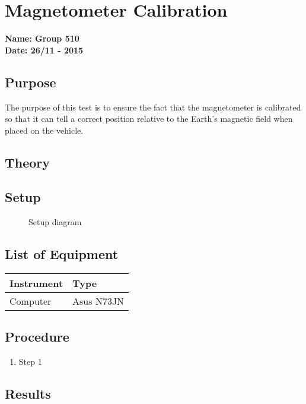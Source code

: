 \pagebreak
\section{Magnetometer Calibration} \label{app:magnetoCalibration}
\textbf{Name: Group 510}\\
\textbf{Date: 26/11 - 2015}

\subsection{Purpose}
The purpose of this test is to ensure the fact that the magnetometer is calibrated so that it can tell a correct position relative to the Earth's magnetic field when placed on the vehicle.

\subsection{Theory}


\subsection{Setup}
\begin{figure}[H]
  \centering
  \caption{Setup diagram}
  \label{calibrationSetupDiagram}
\end{figure}

\subsection{List of Equipment}

\begin{table}[H]
\begin{tabular}{|p{10cm}|p{4cm}|}
\hline%
  \textbf{Instrument}                     &  \textbf{Type}       \\
\hline%
  Computer                                &  Asus N73JN    \\
\hline %
\end{tabular}
\end{table}

\subsection{Procedure}

\begin{enumerate}
  \item Step 1
\end{enumerate}

\subsection{Results} \label{magnetoCalibrationResults}

